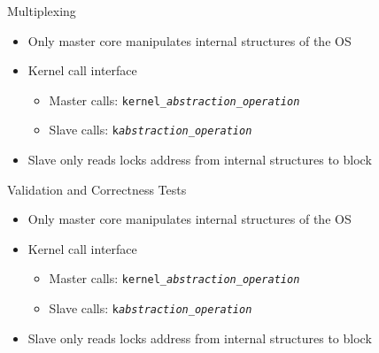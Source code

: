 		\begin{frame}[fragile]{Multiplexing}
			\begin{itemize}
				\item Only master core manipulates internal structures of the OS
				\item Kernel call interface
				\begin{itemize}
					\item Master calls: \texttt{kernel\_\textit{abstraction}\_\textit{operation}}
					\item Slave calls: \texttt{k\textit{abstraction}\_\textit{operation}}
				\end{itemize}
				\item Slave only reads locks address from internal structures to block
			\end{itemize}
		\end{frame}

		\begin{frame}[fragile]{Validation and Correctness Tests}
			\begin{itemize}
				\item Only master core manipulates internal structures of the OS
				\item Kernel call interface
				\begin{itemize}
					\item Master calls: \texttt{kernel\_\textit{abstraction}\_\textit{operation}}
					\item Slave calls: \texttt{k\textit{abstraction}\_\textit{operation}}
				\end{itemize}
				\item Slave only reads locks address from internal structures to block
			\end{itemize}
		\end{frame}

